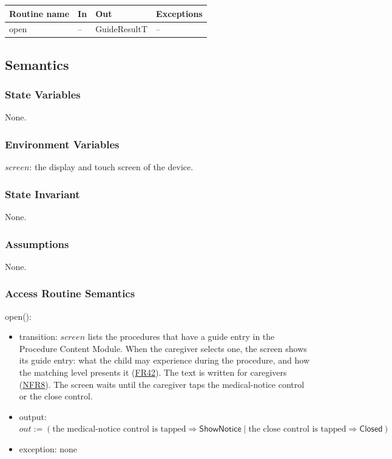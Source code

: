 \documentclass[10pt, titlepage]{article}
\newcommand{\srsurl}{https://team-hindsight.github.io/ophthamology-game/SRS/SRS.pdf}
\newcommand{\srsitemref}[2]{\href{\srsurl\#nameddest=#1}{#2}}
\newcommand{\T}[1]{\mathit{#1}}          %
\newcommand{\V}[1]{\mathsf{#1}}          %
\newcommand{\out}{\mathit{out}}
\newenvironment{accessprogs}{%
  \begin{center}\small
  \begin{tabular}{>{\raggedright\arraybackslash}p{3.0cm}
    >{\raggedright\arraybackslash}p{5.0cm}
    >{\raggedright\arraybackslash}p{2.8cm}
    >{\raggedright\arraybackslash}p{3.4cm}}
  \toprule
  \textbf{Routine name} & \textbf{In} & \textbf{Out} & \textbf{Exceptions}\\
  \midrule}{%
  \bottomrule
  \end{tabular}
  \end{center}}
\begin{document}
\begin{accessprogs}
open & -- & GuideResultT & --\\
\end{accessprogs}

\subsection{Semantics}

\subsubsection{State Variables}

None.

\subsubsection{Environment Variables}

$\T{screen}$: the display and touch screen of the device.

\subsubsection{State Invariant}

None.

\subsubsection{Assumptions}

None.

\subsubsection{Access Routine Semantics}

\noindent open():
\begin{itemize}
\item transition: $\T{screen}$ lists the procedures that have a guide entry
  in the Procedure Content Module. When the caregiver selects one, the screen
  shows its guide entry: what the child may experience during the procedure,
  and how the matching level presents it
  (\srsitemref{FR_ProcedureGuide}{FR42}). The text is written for caregivers
  (\srsitemref{NFR_Language}{NFR8}). The screen waits until the caregiver
  taps the medical-notice control or the close control.
\item output: $\out := (\text{the medical-notice control is tapped}
  \Rightarrow \V{ShowNotice} \mid \text{the close control is tapped}
  \Rightarrow \V{Closed})$
\item exception: none
\end{itemize}
\end{document}
